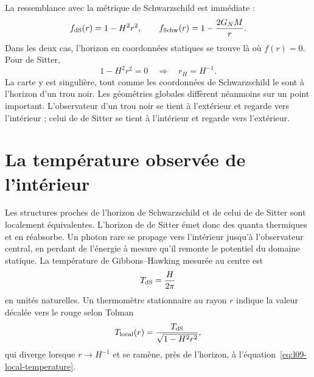 La ressemblance avec la métrique de Schwarzschild est immédiate :
\begin{equation}
f_{\rm dS}(r)=1-H^2r^2,
\qquad
f_{\rm Schw}(r)=1-\frac{2G_NM}{r}.
\end{equation}
Dans les deux cas, l’horizon en coordonnées statiques se trouve là où \(f(r)=0\). Pour de Sitter,
\begin{equation}
1-H^2r^2=0
\quad\Longrightarrow\quad
r_H=H^{-1}.
\end{equation}
La carte y est singulière, tout comme les coordonnées de Schwarzschild le sont à l’horizon d’un trou noir. Les géométries globales diffèrent néanmoins sur un point important. L’observateur d’un trou noir se tient à l’extérieur et regarde vers l’intérieur ; celui de de Sitter se tient à l’intérieur et regarde vers l’extérieur.

\begin{classroomqa}
\end{classroomqa}

\begin{classroomqa}
\end{classroomqa}

\section{La température observée de l’intérieur}

Les structures proches de l’horizon de Schwarzschild et de celui de de Sitter sont localement équivalentes. L’horizon de de Sitter émet donc des quanta thermiques et en réabsorbe. Un photon rare se propage vers l’intérieur jusqu’à l’observateur central, en perdant de l’énergie à mesure qu’il remonte le potentiel du domaine statique. La température de Gibbons--Hawking mesurée au centre est
\begin{equation}
T_{\rm dS}=\frac{H}{2\pi}
\label{eq:l09-de-sitter-temperature}
\end{equation}
en unités naturelles. Un thermomètre stationnaire au rayon \(r\) indique la valeur décalée vers le rouge selon Tolman
\begin{equation}
T_{\rm local}(r)=
\frac{T_{\rm dS}}{\sqrt{1-H^2r^2}},
\label{eq:l09-tolman}
\end{equation}
qui diverge lorsque \(r\to H^{-1}\) et se ramène, près de l’horizon, à l’équation~\eqref{eq:l09-local-temperature}.

